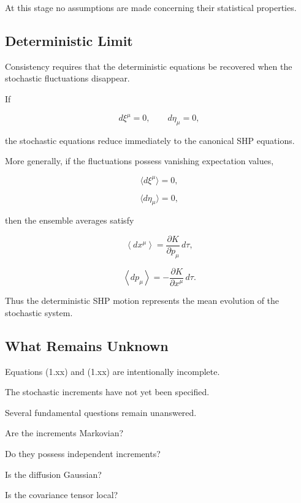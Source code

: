 At this stage no assumptions are made concerning their statistical
properties.

\subsection{Deterministic Limit}

Consistency requires that the deterministic equations be recovered when
the stochastic fluctuations disappear.

If

\[
d\xi^\mu=0,
\qquad
d\eta_\mu=0,
\]

the stochastic equations reduce immediately to the canonical SHP
equations.

More generally, if the fluctuations possess vanishing expectation
values,

\[
\langle d\xi^\mu\rangle =0,
\]

\[
\langle d\eta_\mu\rangle =0,
\]

then the ensemble averages satisfy

\[
\left\langle
dx^\mu
\right\rangle
=
\frac{\partial K}{\partial p_\mu}
\,d\tau,
\]

\[
\left\langle
dp_\mu
\right\rangle
=
-
\frac{\partial K}{\partial x^\mu}
\,d\tau.
\]

Thus the deterministic SHP motion represents the mean evolution of the
stochastic system.

\subsection{What Remains Unknown}

Equations (1.xx) and (1.xx) are intentionally incomplete.

The stochastic increments have not yet been specified.

Several fundamental questions remain unanswered.

Are the increments Markovian?

Do they possess independent increments?

Is the diffusion Gaussian?

Is the covariance tensor local?

